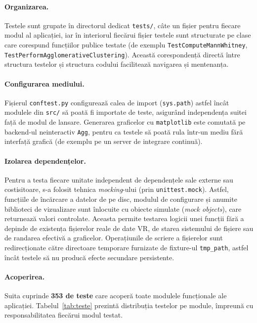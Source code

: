\paragraph{Organizarea.} Testele sunt grupate în directorul dedicat
\texttt{tests/}, câte un fișier pentru fiecare modul al aplicației, iar în
interiorul fiecărui fișier testele sunt structurate pe clase care corespund
funcțiilor publice testate (de exemplu \texttt{TestComputeMannWhitney},
\texttt{TestPerformAgglomerativeClustering}). Această corespondență directă
între structura testelor și structura codului facilitează navigarea și
mentenanța.

\paragraph{Configurarea mediului.} Fișierul \texttt{conftest.py} configurează
calea de import (\texttt{sys.path}) astfel încât modulele din \texttt{src/} să
poată fi importate de teste, asigurând independența suitei față de modul de
lansare. Generarea graficelor cu \texttt{matplotlib} este comutată pe backend-ul
neinteractiv \texttt{Agg}, pentru ca testele să poată rula într-un mediu fără
interfață grafică (de exemplu pe un server de integrare continuă).

\paragraph{Izolarea dependențelor.} Pentru a testa fiecare unitate independent
de dependențele sale externe sau costisitoare, s-a folosit tehnica
\emph{mocking}-ului (prin \texttt{unittest.mock}). Astfel, funcțiile de
încărcare a datelor de pe disc, modulul de configurare și anumite biblioteci de
vizualizare sunt înlocuite cu obiecte simulate (\emph{mock objects}), care
returnează valori controlate. Aceasta permite testarea logicii unei funcții
fără a depinde de existența fișierelor reale de date VR, de starea sistemului de
fișiere sau de randarea efectivă a graficelor. Operațiunile de scriere a
fișierelor sunt redirecționate către directoare temporare furnizate de
fixture-ul \texttt{tmp\_path}, astfel încât testele să nu producă efecte
secundare persistente.

\paragraph{Acoperirea.} Suita cuprinde \textbf{353 de teste} care acoperă toate
modulele funcționale ale aplicației. Tabelul~\ref{tab:teste} prezintă
distribuția testelor pe module, împreună cu responsabilitatea fiecărui modul
testat.

